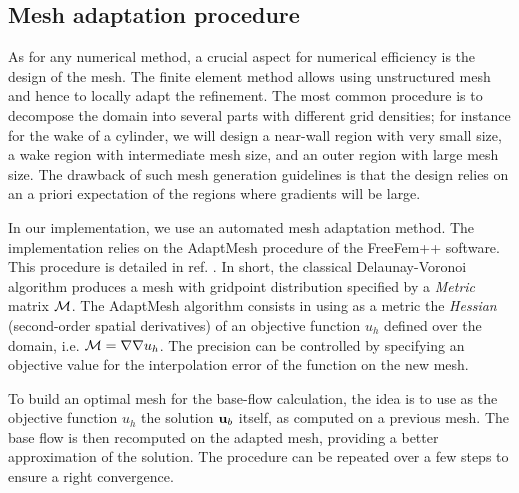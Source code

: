 \documentclass[twocolumn,10pt]{asme2ej}
\begin{document}
\subsection{Mesh adaptation procedure}
\vspace{.2cm}

As for any numerical method, a crucial aspect for numerical efficiency is the design of the mesh. The finite element method allows using unstructured mesh and hence to locally adapt the refinement. %
The most common procedure is to decompose the domain into several parts with different grid densities; for instance for the wake of a cylinder, we will design a near-wall region with very small  size, a wake region with intermediate mesh size, and an outer region with large mesh size. The drawback of such mesh generation guidelines is that the design relies on an a priori expectation of the regions where gradients will be large. 

In our implementation, we use an automated mesh adaptation method. %
The implementation relies on the AdaptMesh procedure of the FreeFem++ software. This procedure is detailed in ref. \cite{adapt}. 
In short, the classical Delaunay-Voronoi algorithm produces a mesh with gridpoint distribution specified by a {\em Metric } matrix $\cal M$. The AdaptMesh algorithm consists in using as a metric the {\em Hessian} (second-order spatial derivatives) of an objective function $u_h$ defined over the domain, i.e. ${\cal M} = \nabla \nabla u_h$. The precision can be controlled by specifying an objective value for the interpolation error of the function on the new mesh.

To build an optimal mesh for the base-flow calculation, the idea is to use as the objective function $u_h$ the solution ${\bf u}_b$ itself, as computed on a previous mesh. %
The base flow is then recomputed on the adapted mesh, providing a better approximation of the solution. The procedure can be repeated over a few steps to ensure a right convergence.
\end{document}
